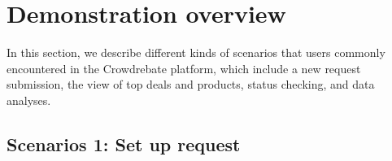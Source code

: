 \section{Demonstration overview}

In this section, we describe different kinds of scenarios that users commonly encountered in the Crowdrebate platform, which include a new request submission, the view of top deals and products, status checking, and data analyses.

\subsection{Scenarios 1: Set up request}

\begin{figure}[t!] \vspace{-1.5ex}
\end{figure}
